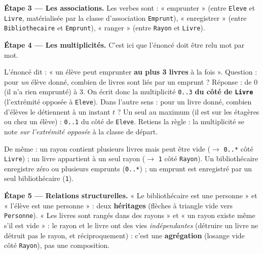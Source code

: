 \documentclass[11pt]{article}
\begin{document}
\textbf{Étape 3 — Les associations.} Les verbes sont : « emprunter » (entre \texttt{Eleve} et \texttt{Livre}, matérialisée par la classe d'association \texttt{Emprunt}), « enregistrer » (entre \texttt{Bibliothecaire} et \texttt{Emprunt}), « ranger » (entre \texttt{Rayon} et \texttt{Livre}).

\textbf{Étape 4 — Les multiplicités.} C'est ici que l'énoncé doit être relu mot par mot.

\begin{exemplebox}
L'énoncé dit : « un élève peut emprunter \textbf{au plus 3 livres} à la fois ». Question : pour \emph{un} élève donné, combien de livres sont liés par un emprunt ? Réponse : de 0 (il n'a rien emprunté) à 3. On écrit donc la multiplicité \texttt{0..3} \textbf{du côté de \texttt{Livre}} (l'extrémité opposée à \texttt{Eleve}). Dans l'autre sens : pour un livre donné, combien d'élèves le détiennent à un instant $t$ ? Un seul au maximum (il est sur les étagères ou chez un élève) : \texttt{0..1} du côté de \texttt{Eleve}. Retiens la règle : la multiplicité se note \emph{sur l'extrémité opposée} à la classe de départ.
\end{exemplebox}

De même : un rayon contient plusieurs livres mais peut être vide ($\rightarrow$ \texttt{0..*} côté \texttt{Livre}) ; un livre appartient à un seul rayon ($\rightarrow$ \texttt{1} côté \texttt{Rayon}). Un bibliothécaire enregistre zéro ou plusieurs emprunts (\texttt{0..*}) ; un emprunt est enregistré par un seul bibliothécaire (\texttt{1}).

\textbf{Étape 5 — Relations structurelles.} « Le bibliothécaire est une personne » et « l'élève est une personne » : deux \textbf{héritages} (flèches à triangle vide vers \texttt{Personne}). « Les livres sont rangés dans des rayons » et « un rayon existe même s'il est vide » : le rayon et le livre ont des vies \emph{indépendantes} (détruire un livre ne détruit pas le rayon, et réciproquement) : c'est une \textbf{agrégation} (losange vide côté \texttt{Rayon}), pas une composition.
\end{document}
